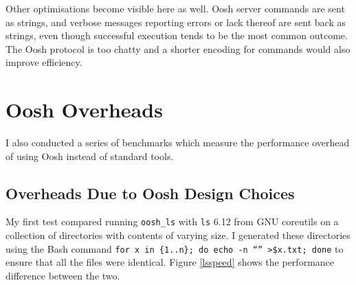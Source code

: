 \documentclass[12pt,twoside,notitlepage]{report}
\begin{document}
Other optimisations become visible here as well. Oosh server commands
are sent as strings, and verbose messages reporting errors or lack
thereof are sent back as strings, even though successful execution
tends to be the most common outcome. The Oosh protocol is too chatty
and a shorter encoding for commands would also improve efficiency.






\section{Oosh Overheads}
I also conducted a series of benchmarks which measure the performance
overhead of using Oosh instead of standard tools.

\subsection{Overheads Due to Oosh Design Choices}
My first test compared running {\tt oosh\_ls} with {\tt ls} 6.12 from
GNU coreutils on a collection of directories with contents of varying
size. I generated these directories using the Bash command {\tt for x
  in \{1..n\}; do echo -n ``'' >\$x.txt; done} to ensure that all the
files were identical. Figure \ref{lsspeed} shows the performance
difference between the two.
\end{document}
